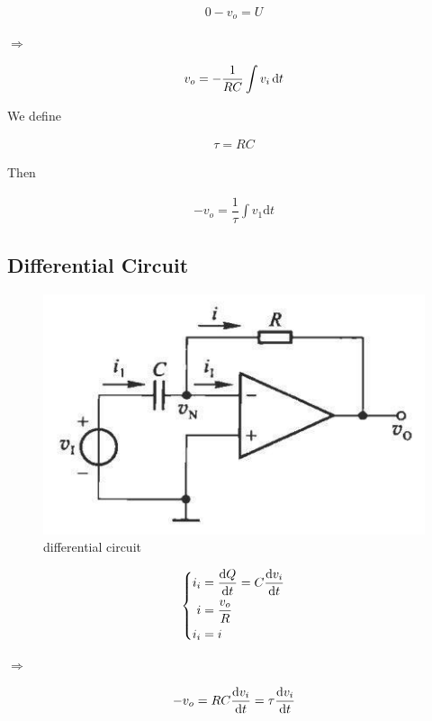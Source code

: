 \begin{equation*}
  \begin{aligned}
    0 - v_o = U
  \end{aligned}
\end{equation*}

$\Rightarrow$

\begin{equation*}
  \begin{aligned}
    v_o = - \dfrac{1}{RC} \int v_i \mathop{}\!\mathrm{d} t
  \end{aligned}
\end{equation*}

We define

\begin{equation*}
  \begin{aligned}
    \tau = RC
  \end{aligned}
\end{equation*}

Then

\begin{equation*}
  \begin{aligned}
    - v_o = \dfrac{1}{\tau} \int v_{1} \mathrm{d} t
  \end{aligned}
\end{equation*}

\subsection{Differential Circuit}

\begin{figure}[H]
  \centering
  \includegraphics[width=0.4\linewidth]{figures/differential-circuit}
  \caption{differential circuit}
  \label{fig:}
\end{figure}

\begin{equation*}
  \left\{
  \begin{aligned}
    i_i &= \dfrac{\mathop{}\!\mathrm{d} Q}{\mathop{}\!\mathrm{d} t} = C \dfrac{\mathop{}\!\mathrm{d} v_i}{\mathop{}\!\mathrm{d} t}  \\
    i &= \dfrac{v_o}{R} \\
    i_i &= i
  \end{aligned}
  \right.
\end{equation*}

$\Rightarrow$

\begin{equation*}
  \begin{aligned}
    - v_o = R C \dfrac{\mathrm{d} v_i}{\mathrm{d} t} = \tau \dfrac{\mathop{}\!\mathrm{d} v_i}{\mathop{}\!\mathrm{d} t} 
  \end{aligned}
\end{equation*}


